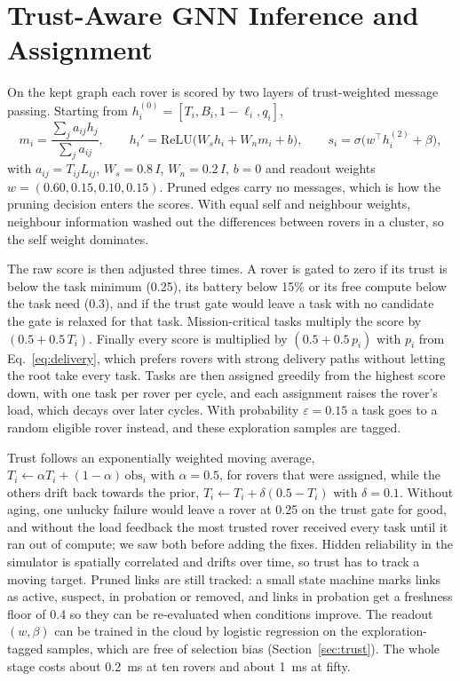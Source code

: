 \documentclass[11pt]{article}
\begin{document}
\section{Trust-Aware GNN Inference and Assignment}
\label{sec:gnn}

On the kept graph each rover is scored by two layers of trust-weighted
message passing. Starting from $h_i^{(0)}=[T_i,B_i,1-\ell_i,q_i]$,
\[
m_i=\frac{\sum_j a_{ij}h_j}{\sum_j a_{ij}},\qquad
h_i'=\mathrm{ReLU}\big(W_sh_i+W_nm_i+b\big),\qquad
s_i=\sigma\big(w^{\top}h_i^{(2)}+\beta\big),
\]
with $a_{ij}=T_{ij}L_{ij}$, $W_s=0.8\,I$, $W_n=0.2\,I$, $b=0$ and readout
weights $w=(0.60,0.15,0.10,0.15)$. Pruned edges carry no messages, which is how
the pruning decision enters the scores. With equal self and neighbour weights,
neighbour information washed out the differences between rovers in a cluster,
so the self weight dominates.

The raw score is then adjusted three times. A rover is gated to zero if its
trust is below the task minimum (0.25), its battery below 15\% or its free
compute below the task need (0.3), and if the trust gate would leave a task
with no candidate the gate is relaxed for that task. Mission-critical tasks
multiply the score by $(0.5+0.5\,T_i)$. Finally every score is multiplied by
$(0.5+0.5\,p_i)$ with $p_i$ from Eq.~\eqref{eq:delivery}, which prefers
rovers with strong delivery paths without letting the root take every task.
Tasks are then assigned greedily from the highest score down, with one task
per rover per cycle, and each assignment raises the rover's load, which decays
over later cycles. With probability $\varepsilon=0.15$ a task goes to a
random eligible rover instead, and these exploration samples are tagged.

Trust follows an exponentially weighted moving average,
$T_i\leftarrow\alpha T_i+(1-\alpha)\,\mathrm{obs}_i$ with $\alpha=0.5$, for
rovers that were assigned, while the others drift back towards the prior,
$T_i\leftarrow T_i+\delta(0.5-T_i)$ with $\delta=0.1$. Without aging, one
unlucky failure would leave a rover at 0.25 on the trust gate for good, and
without the load feedback the most trusted rover received every task until it
ran out of compute; we saw both before adding the fixes. Hidden reliability
in the simulator is spatially correlated and drifts over time, so trust has to
track a moving target. Pruned links are still tracked: a small state machine
marks links as active, suspect, in probation or removed, and links in
probation get a freshness floor of 0.4 so they can be re-evaluated when
conditions improve. The readout $(w,\beta)$ can be trained in the cloud by
logistic regression on the exploration-tagged samples, which are free of
selection bias (Section~\ref{sec:trust}). The whole stage costs about 0.2~ms
at ten rovers and about 1~ms at fifty.
\end{document}
